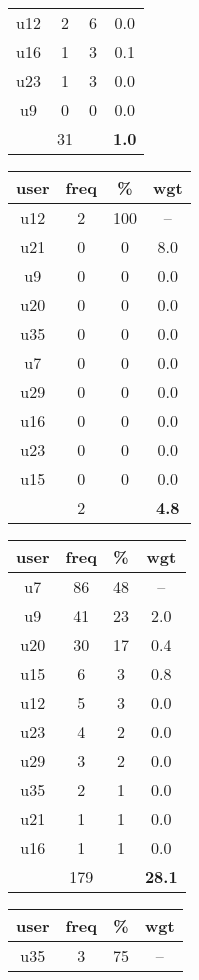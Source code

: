 \begin{appendices}
\begin{table}
\begin{tabular}{ |c|c|c|c| }
	u12 & 2 & 6 & 0.0 \\
	u16 & 1 & 3 & 0.1 \\
	u23 & 1 & 3 & 0.0 \\
	u9 & 0 & 0 & 0.0 \\
	 & 31 & & \textbf{1.0} \\
	\hline
\end{tabular}
\begin{tabular}{ |c|c|c|c| }
	\hline
	\textbf{user} & \textbf{freq} & \textbf{\%} & \textbf{wgt} \\
	\hline
	u12 & 2 & 100 & -- \\
	u21 & 0 & 0 & 8.0 \\
	u9 & 0 & 0 & 0.0 \\
	u20 & 0 & 0 & 0.0 \\
	u35 & 0 & 0 & 0.0 \\
	u7 & 0 & 0 & 0.0 \\
	u29 & 0 & 0 & 0.0 \\
	u16 & 0 & 0 & 0.0 \\
	u23 & 0 & 0 & 0.0 \\
	u15 & 0 & 0 & 0.0 \\
	 & 2 & & \textbf{4.8} \\
	\hline
\end{tabular}
\begin{tabular}{ |c|c|c|c| }
	\hline
	\textbf{user} & \textbf{freq} & \textbf{\%} & \textbf{wgt} \\
	\hline
	u7 & 86 & 48 & -- \\
	u9 & 41 & 23 & 2.0 \\
	u20 & 30 & 17 & 0.4 \\
	u15 & 6 & 3 & 0.8 \\
	u12 & 5 & 3 & 0.0 \\
	u23 & 4 & 2 & 0.0 \\
	u29 & 3 & 2 & 0.0 \\
	u35 & 2 & 1 & 0.0 \\
	u21 & 1 & 1 & 0.0 \\
	u16 & 1 & 1 & 0.0 \\
	 & 179 & & \textbf{28.1} \\
	\hline
\end{tabular}
\begin{tabular}{ |c|c|c|c| }
	\hline
	\textbf{user} & \textbf{freq} & \textbf{\%} & \textbf{wgt} \\
	\hline
	u35 & 3 & 75 & -- \\

\end{tabular}
\end{table}
\end{appendices}
